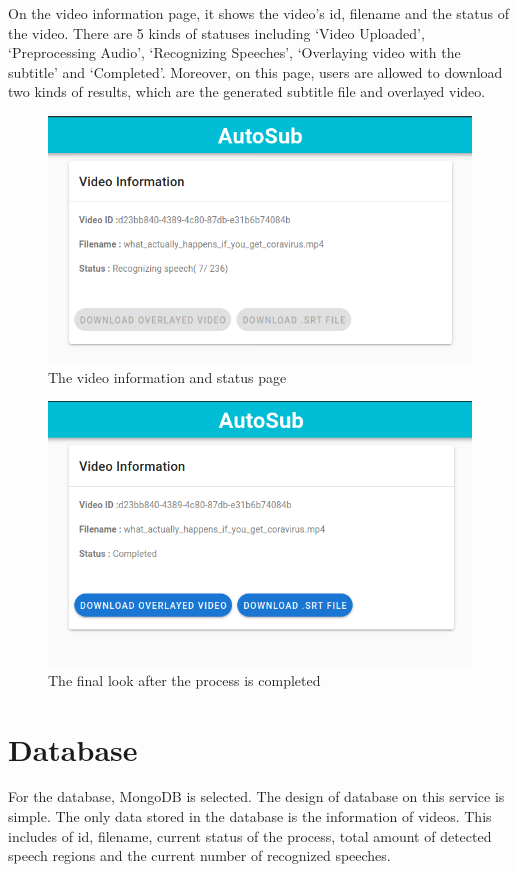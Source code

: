 \documentclass[natbib]{muthesis}
\begin{document}
 On the video information page, it shows the video's id, filename and the status of the video. There are 5 kinds of statuses including `Video Uploaded', `Preprocessing Audio', `Recognizing Speeches', `Overlaying video with the subtitle' and `Completed'. Moreover, on this page, users are allowed to download two kinds of results, which are the generated subtitle file and overlayed video.
 \begin{figure}[H]
 	\centering
 	\captionsetup{justification=centering}
 	\includegraphics[width=0.8\linewidth]{images/info-recognizing}
 	\caption{The video information and status page}
 	\label{fig:frontend-info}
 \end{figure}

 \begin{figure}[H]
 	\centering
 	\captionsetup{justification=centering}
 	\includegraphics[width=0.8\linewidth]{images/info-completed}
 	\caption{The final look after the process is completed}
 	\label{fig:frontend-info-complete}
 \end{figure}
 
 \section{Database}
 For the database, MongoDB is selected. The design of database on this service is simple. The only data stored in the database is the information of videos. This includes of id, filename, current status of the process, total amount of detected speech regions and the current number of recognized speeches.
 
\end{document}
